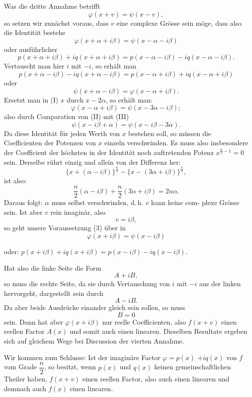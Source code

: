 \documentclass[11pt]{article}
\providecommand{\weberpage}[1]{}
\providecommand{\weq}[2]{\begin{equation}\tag{#1}#2\end{equation}}
\begin{document}
Was die dritte Annahme betrifft
\[ \varphi(x+v) = \psi(x-v), \]
so setzen wir zunächst voraus, dass $v$ eine complexe Grösse sein
möge, dass also die Identität bestehe
\weq{I}{\varphi(x+\alpha+i\beta) = \psi(x-\alpha-i\beta)}
oder ausführlicher
\[ p(x+\alpha+i\beta) + iq(x+\alpha+i\beta) = p(x-\alpha-i\beta) - iq(x-\alpha-i\beta). \]
Vertauscht man hier $i$ mit $-i$, so erhält man
\[ p(x+\alpha-i\beta) - iq(x+\alpha-i\beta) = p(x-\alpha+i\beta) + iq(x-\alpha+i\beta) \]
oder
\weq{II}{\psi(x+\alpha-i\beta) = \varphi(x-\alpha+i\beta).}
Ersetzt man in (I) $x$ durch $x-2\alpha$, so erhält man:
\weq{III}{\varphi(x-\alpha+i\beta) = \psi(x-3\alpha-i\beta);}
also durch Comparation von (II) mit (III)
\[ \psi(x-i\beta+\alpha) = \psi(x-i\beta-3\alpha). \]
Da diese Identität für jeden Werth von $x$ bestehen soll, so müssen
die Coefficienten der Potenzen von $x$ einzeln verschwinden. Es muss
also insbesondere der Coefficient der höchsten in der Identität noch
auftretenden Potenz $x^{\frac{n}{2}-1} = 0$ sein. Derselbe rührt einzig und allein
von der Differenz her:
\[ \{x + (\alpha - i\beta)\}^{\frac{n}{2}} - \{x - (3\alpha + i\beta)\}^{\frac{n}{2}}, \]
ist also:
\[ \frac{n}{2}(\alpha - i\beta) + \frac{n}{2}(3\alpha + i\beta) = 2n\alpha. \]
Daraus folgt: $\alpha$ muss selbst verschwinden, d.\,h. $v$ kann keine com-
plexe Grösse sein. Ist aber $v$ rein imaginär, also
\[ v = i\beta, \]
so geht unsere Voraussetzung (3) über in
\[ \varphi(x+i\beta) = \psi(x-i\beta) \]


\weberpage{174}

oder: \quad $p(x+i\beta) + iq(x+i\beta) = p(x-i\beta) - iq(x-i\beta).$

Hat also die linke Seite die Form
\[ A + iB, \]
so muss die rechte Seite, da sie durch Vertauschung von $i$ mit $-i$
aus der linken hervorgeht, dargestellt sein durch
\[ A - iB. \]
Da aber beide Ausdrücke einander gleich sein sollen, so muss
\[ B = 0 \]
sein. Dann hat aber $\varphi(x+i\beta)$ nur reelle Coefficienten, also $f(x+v)$
einen reellen Factor $A(x)$ und somit auch einen linearen. Dieselben
Resultate ergeben sich auf gleichem Wege bei Discussion der vierten
Annahme.

Wir kommen zum Schlusse: Ist der imaginäre Factor $\varphi = p(x)$
$+ iq(x)$ von $f$ vom Grade $\dfrac{n}{2}$, so besitzt, wenn $p(x)$ und $q(x)$ keinen
gemeinschaftlichen Theiler haben, $f(x+v)$ einen reellen Factor, also
auch einen linearen und demnach auch $f(x)$ einen linearen.
\end{document}
